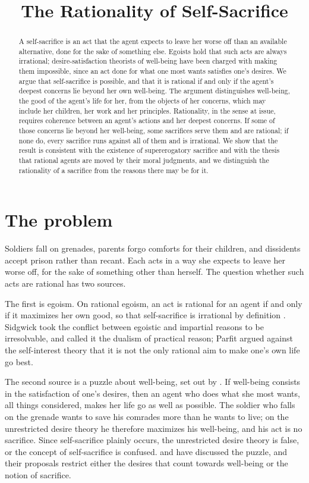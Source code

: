 \documentclass{situationist-preprint}
\title{The Rationality of Self-Sacrifice}
\begin{document}
\maketitle

\begin{abstract}
A self-sacrifice is an act that the agent expects to leave her worse off than an available alternative, done for the sake of something else. Egoists hold that such acts are always irrational; desire-satisfaction theorists of well-being have been charged with making them impossible, since an act done for what one most wants satisfies one's desires. We argue that self-sacrifice is possible, and that it is rational if and only if the agent's deepest concerns lie beyond her own well-being. The argument distinguishes well-being, the good of the agent's life for her, from the objects of her concerns, which may include her children, her work and her principles. Rationality, in the sense at issue, requires coherence between an agent's actions and her deepest concerns. If some of those concerns lie beyond her well-being, some sacrifices serve them and are rational; if none do, every sacrifice runs against all of them and is irrational. We show that the result is consistent with the existence of supererogatory sacrifice and with the thesis that rational agents are moved by their moral judgments, and we distinguish the rationality of a sacrifice from the reasons there may be for it.
\end{abstract}

\section{The problem}

Soldiers fall on grenades, parents forgo comforts for their children, and dissidents accept prison rather than recant. Each acts in a way she expects to leave her worse off, for the sake of something other than herself. The question whether such acts are rational has two sources.

The first is egoism. On rational egoism, an act is rational for an agent if and only if it maximizes her own good, so that self-sacrifice is irrational by definition \citep{Sidgwick1874,Parfit1984}. Sidgwick took the conflict between egoistic and impartial reasons to be irresolvable, and called it the dualism of practical reason; Parfit argued against the self-interest theory that it is not the only rational aim to make one's own life go best.

The second source is a puzzle about well-being, set out by \citet{Overvold1980}. If well-being consists in the satisfaction of one's desires, then an agent who does what she most wants, all things considered, makes her life go as well as possible. The soldier who falls on the grenade wants to save his comrades more than he wants to live; on the unrestricted desire theory he therefore maximizes his well-being, and his act is no sacrifice. Since self-sacrifice plainly occurs, the unrestricted desire theory is false, or the concept of self-sacrifice is confused. \citet{Heathwood2011} and \citet{Portmore2007} have discussed the puzzle, and their proposals restrict either the desires that count towards well-being or the notion of sacrifice.
\end{document}
